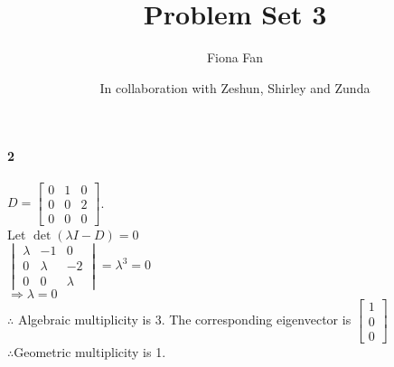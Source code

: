 \documentclass[10pt,letter]{article}
\begin{document}


\title{Problem Set 3}

\author{Fiona Fan}

\date{In collaboration with Zeshun, Shirley and Zunda}
 
\maketitle 



\paragraph{2}
$D=\begin{bmatrix}
0&1&0\\0&0&2\\0&0&0
\end{bmatrix}$. \\ 
Let $\det(\lambda I-D)=0$\\
$\begin{vmatrix}
\lambda&-1&0\\0&\lambda&-2\\0&0&\lambda
\end{vmatrix}=\lambda^3=0$\\
$\Rightarrow \lambda=0$\\
$\therefore$ Algebraic multiplicity is 3. The corresponding eigenvector is $\begin{bmatrix}
1\\0\\0
\end{bmatrix}$\\
$\therefore$Geometric multiplicity is 1.
\end{document}
